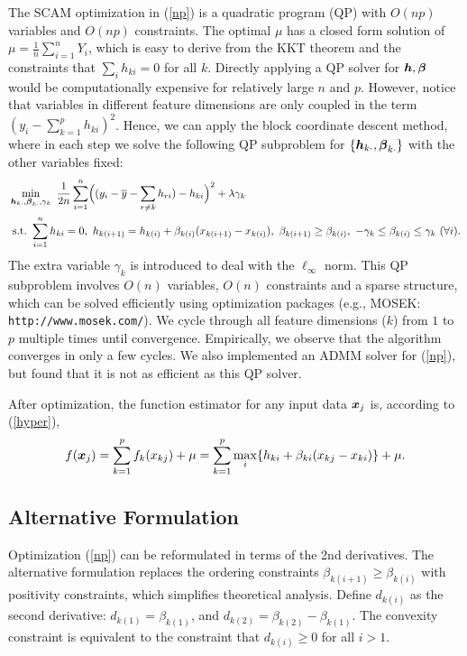The SCAM optimization in (\ref{np}) is a quadratic program (QP) with $O(np)$ variables and $O(np)$ constraints. The optimal $\mu$ has a closed form solution of $\mu = \frac{1}{n}\sum_{i=1}^n Y_i$, which is easy to derive from the KKT theorem and the constraints that $\sum_i h_{ki} = 0$ for all $k$.
Directly applying a QP solver for $\boldsymbol{h}, \boldsymbol{\beta}$ would be computationally expensive for relatively large $n$ and $p$. However, notice that variables
in different feature dimensions are only coupled in the term $(y_{i}-\sum_{k=1}^{p}h_{ki})^{2}$. Hence, we can apply the block coordinate descent method,
where in each step we solve the following QP subproblem for
$\{\boldsymbol{h}_{k\cdot},\boldsymbol{\beta}_{k\cdot}\}$ with the other variables fixed:
\begin{equation}\begin{split}\nonumber
       &\min_{\bds{h}_{k\cdot},\bds{\beta}_{k\cdot},\gamma_{k}} 
             \ \frac{1}{2n}\sum_{i=1}^{n}\Bigl((y_{i}-\bar{y}-\sum_{r\neq{k}}h_{ri})-h_{ki}\Bigr)^{2} 
                      + \lambda\gamma_{k} \\
        &\ \textrm{s.t.} \ \sum_{i=1}^{n}h_{ki}=0, \ h_{k(i+1)} = h_{k(i)} + \beta_{k(i)}(x_{k(i+1)}-x_{k(i)}), \ \beta_{k(i+1)} \geq \beta_{k(i)}, \ -\gamma_{k}\leq\beta_{k(i)}\leq\gamma_{k} \ (\forall i).
\end{split}\end{equation}
The extra variable $\gamma_{k}$ is introduced to deal with the $\ell_{\infty}$ norm. This QP subproblem involves $O(n)$ variables, $O(n)$ constraints and a sparse structure, 
which can be solved efficiently using optimization packages (e.g., MOSEK: \verb+http://www.mosek.com/+).  We cycle through all feature dimensions ($k$) from $1$ to $p$ multiple times until convergence.
Empirically, we observe that the algorithm converges in only a few cycles. We also implemented an ADMM solver for (\ref{np}), but found that it is not as efficient as this QP solver.

After optimization, the function estimator for any input data $\boldsymbol{x}_j$ is, according to (\ref{hyper}),
\begin{equation}\nonumber
      f(\boldsymbol{x}_j) = \sum_{k=1}^{p}f_k(x_{kj})+\mu = \sum_{k=1}^{p}\max_{i} \{h_{ki}+\beta_{ki}(x_{kj}-x_{ki})\} + \mu.
\end{equation} 


\subsection{Alternative Formulation}
Optimization (\ref{np}) can be reformulated in terms of the 2nd derivatives. The alternative formulation replaces the ordering
constraints $\beta_{k(i+1)} \geq \beta_{k(i)}$ with positivity
constraints, which simplifies theoretical analysis.
Define $d_{k(i)}$ as the second derivative:
$d_{k(1)} = \beta_{k(1)}$, and $d_{k(2)} =
\beta_{k(2)} - \beta_{k(1)}$. The convexity constraint is
equivalent to the constraint that $d_{k(i)} \geq 0$ for all $i >
1$.

